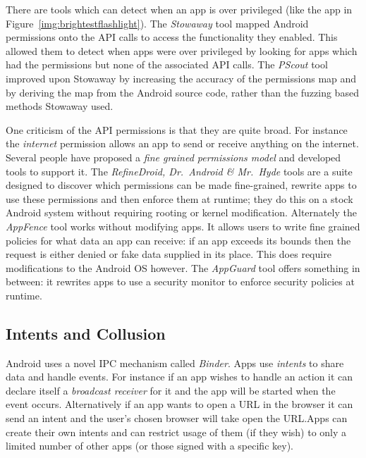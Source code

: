 \documentclass[a4paper,12pt,sfsidenotes]{tufte-book}
\begin{document}
There are tools which can detect when an app is over privileged (like the app in
Figure~\ref{img:brightestflashlight}). The
\emph{Stowaway} tool\cite{Felt:2011kj} mapped Android permissions onto the API
calls to access the functionality they enabled. This allowed them to detect
when apps were over privileged by looking for apps which had the permissions but
none of the associated API calls. The \emph{PScout} tool\cite{Au:2012ju}
improved upon Stowaway by increasing the accuracy of the permissions map and by
deriving the map from the Android source code, rather than the fuzzing based
methods Stowaway used.

One criticism of the API permissions is that they are quite broad. For instance
the \emph{internet} permission allows an app to send or receive anything on the
internet. Several people have proposed a \emph{fine grained permissions model}
and developed tools to support it. The \emph{RefineDroid, Dr.~Android \&
  Mr.~Hyde} tools\cite{Jeon:2012ki} are a suite designed to discover which
permissions can be made fine-grained, rewrite apps to use these permissions and
then enforce them at runtime; they do this on a stock Android system without
requiring rooting or kernel modification. Alternately the \emph{AppFence}
tool\cite{Hornyack:2011wq} works without modifying apps. It allows users to
write fine grained policies for what data an app can receive: if an app exceeds
its bounds then the request is either denied or fake data supplied in its place.
This does require modifications to the Android OS however. The \emph{AppGuard}
tool\cite{Backes:2013ec} offers something in between: it rewrites apps to use a
security monitor to enforce security policies at runtime.

\subsection{Intents and Collusion}

Android uses a novel IPC mechanism called \emph{Binder}. Apps use
\emph{intents} to share data and handle events. For instance if an app wishes
to handle an  action it can declare itself a \emph{broadcast
  receiver} for it and the app will be started when the event occurs.
Alternatively if an app wants to open a URL in the browser it can send an
 intent and the user's chosen browser will take open the
URL.\@ Apps can create their own intents and can restrict usage of them (if they
wish) to only a limited number of other apps (or those signed with a specific
key).
\end{document}

